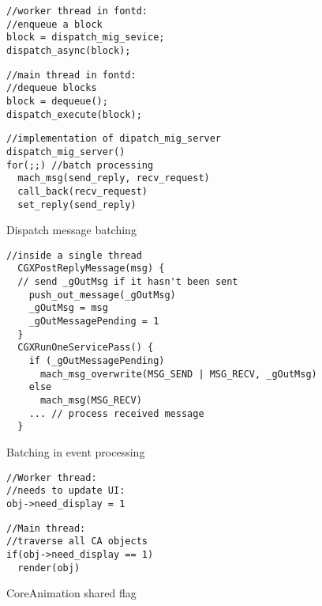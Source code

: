 \begin{figure}[t]
\begin{minipage}[t]{.25\textwidth}
\begin{lstlisting}
//worker thread in fontd:
//enqueue a block
block = dispatch_mig_sevice;
dispatch_async(block);
\end{lstlisting}
\end{minipage}\hfill
\begin{minipage}[t]{.21\textwidth}
\begin{lstlisting}
//main thread in fontd:
//dequeue blocks
block = dequeue();
dispatch_execute(block);
\end{lstlisting}
\end{minipage}

\begin{minipage}[t]{0.48\textwidth}
\begin{lstlisting}
//implementation of dipatch_mig_server
dispatch_mig_server()
for(;;) //batch processing
  mach_msg(send_reply, recv_request)
  call_back(recv_request)
  set_reply(send_reply)
\end{lstlisting}
\end{minipage}
    \caption{Dispatch message batching}
    \label{fig:dispatchmessagebatching}
\end{figure}

\begin{figure}[t]
\begin{lstlisting}
//inside a single thread
  CGXPostReplyMessage(msg) {
  // send _gOutMsg if it hasn't been sent
    push_out_message(_gOutMsg)
    _gOutMsg = msg
    _gOutMessagePending = 1
  }
  CGXRunOneServicePass() {
    if (_gOutMessagePending)
      mach_msg_overwrite(MSG_SEND | MSG_RECV, _gOutMsg)
    else
      mach_msg(MSG_RECV)
    ... // process received message
  }
\end{lstlisting}
\vspace{-0.7cm}
    \caption{Batching in event processing}
    \label{fig:batchingineventprocessing}
\end{figure}

\begin{figure}[t!]
\begin{minipage}[t]{.20\textwidth}
\begin{lstlisting}
//Worker thread:
//needs to update UI:
obj->need_display = 1
\end{lstlisting}\hfill
\end{minipage}
\noindent\begin{minipage}[t]{.25\textwidth}
\begin{lstlisting}
//Main thread: 
//traverse all CA objects
if(obj->need_display == 1)
  render(obj)
\end{lstlisting}\hfill
\end{minipage}
\vspace{-0.7cm}
    \caption{CoreAnimation shared flag}
    \label{fig:casharedflag}
\end{figure}

